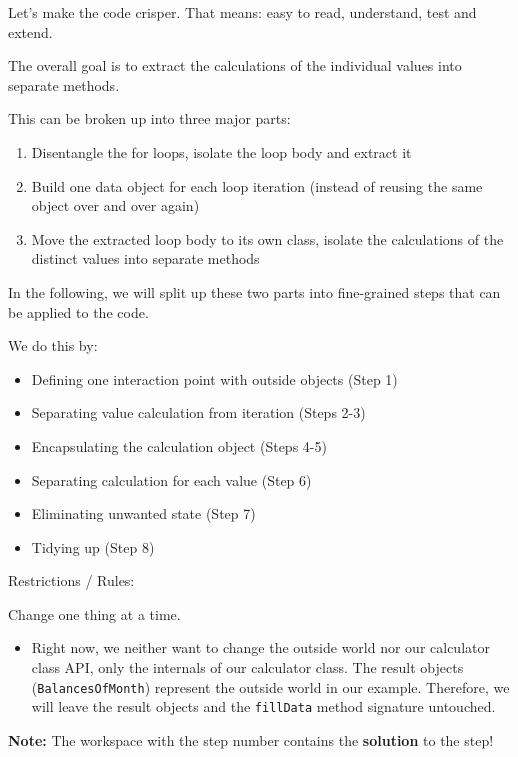 \documentclass[a4paper,fleqn,titlepage,11pt]{article}
\begin{document}
Let's make the code crisper. That means: easy to read, understand, test and extend.

The overall goal is to extract the calculations of the individual values into separate methods.

This can be broken up into three major parts:

\begin{enumerate}
\item Disentangle the for loops, isolate the loop body and extract it
\item Build one data object for each loop iteration (instead of reusing the same object over and over again)

\item Move the extracted loop body to its own class, isolate the calculations of the distinct values into separate methods
\end{enumerate}

In the following, we will split up these two parts into fine-grained steps that can be applied to the code.

We do this by:
\begin{itemize}
	\item Defining one interaction point with outside objects (Step 1)
	\item Separating value calculation from iteration (Steps 2-3)
	\item Encapsulating the calculation object (Steps 4-5)
	\item Separating calculation for each value (Step 6)
	\item Eliminating unwanted state (Step 7)
	\item Tidying up (Step 8)
\end{itemize}

Restrictions / Rules:

Change one thing at a time.

\begin{itemize}
\item Right now, we neither want to change the outside world nor our calculator class API, only the internals of our calculator class. The result objects (\texttt{BalancesOfMonth}) represent the outside world in our example. Therefore, we will leave the result objects and the \texttt{fillData} method signature untouched. 
\end{itemize}


\textbf{Note:} The workspace with the step number contains the \textbf{solution} to the step!
\end{document}
